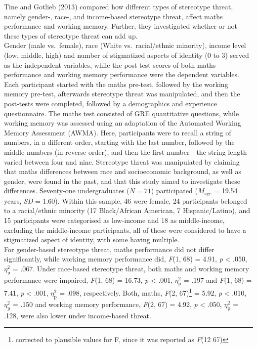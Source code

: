 \documentclass[
  stu,floatsintext]{apa7}
\begin{document}
Tine and Gotlieb (2013) compared how different types of stereotype threat, namely gender-, race-, and income-based stereotype threat, affect maths performance and working memory.
Further, they investigated whether or not these types of stereotype threat can add up.\\
Gender (male vs.~female), race (White vs.~racial/ethnic minority), income level (low, middle, high) and number of stigmatized aspects of identity (0 to 3) served as the independent variables, while the post-test scores of both maths performance and working memory performance were the dependent variables.
Each participant started with the maths pre-test, followed by the working memory pre-test, afterwards stereotype threat was manipulated, and then the post-tests were completed, followed by a demographics and experience questionnaire.
The maths test consisted of GRE quantitative questions, while working memory was assessed using an adaptation of the Automated Working Memory Assessment (AWMA).
Here, participants were to recall a string of numbers, in a different order, starting with the last number, followed by the middle numbers (in reverse order), and then the first number - the string length varied between four and nine.
Stereotype threat was manipulated by claiming that maths differences between race and socioeconomic background, as well as gender, were found in the past, and that this study aimed to investigate these differences.
Seventy-one undergraduates (\(N=71\)) participated (\(M_{\text{age}}\) = 19.54 years, \emph{SD} = 1.60).
Within this sample, 46 were female, 24 participants belonged to a racial/ethnic minority (17 Black/African American, 7 Hispanic/Latino), and 15 participants were categorised as low-income and 18 as middle-income, excluding the middle-income participants, all of these were considered to have a stigmatized aspect of identity, with some having multiple.\\
For gender-based stereotype threat, maths performance did not differ significantly, while working memory performance did, \emph{F}(1, 68) = 4.91, \emph{p} \textless{} .050, \(\eta^{2}_{\text{p}}\) = .067.
Under race-based stereotype threat, both maths and working memory performance were impaired, \emph{F}(1, 68) = 16.73, \emph{p} \textless{} .001, \(\eta^{2}_{\text{p}}\) = .197 and \emph{F}(1, 68) = 7.41, \emph{p} \textless{} .001, \(\eta^{2}_{\text{p}}\) = .098, respectively.
Both, maths, \emph{F}(2, 67)\footnote{corrected to plausible values for F, since it was reported as \emph{F}(12 67)} = 5.92, \emph{p} \textless{} .010, \(\eta^{2}_{\text{p}}\) = .150 and working memory performance, \emph{F}(2, 67) = 4.92, \emph{p} \textless{} .050, \(\eta^{2}_{\text{p}}\) = .128, were also lower under income-based threat.
\end{document}
